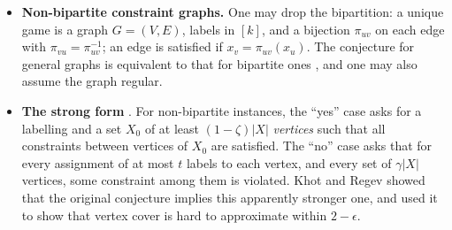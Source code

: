 \documentclass[handoutsbeamer.tex]{subfiles}
\begin{document}
\begin{frame}
\begin{itemize}\setlength\itemsep{0.35em}
    \item \textbf{Non-bipartite constraint graphs.} One may drop the bipartition: a unique game is a graph $G=(V,E)$, labels in $[k]$, and a bijection $\pi_{uv}$ on each edge with $\pi_{vu} = \pi_{uv}^{-1}$; an edge is satisfied if $x_v = \pi_{uv}(x_u)$. The conjecture for general graphs is equivalent to that for bipartite ones \citep{KhotSurvey}, and one may also assume the graph regular.
    \item \textbf{The strong form} \citep{khot2008vertex}. For non-bipartite instances, the ``yes'' case asks for a labelling and a set $X_0$ of at least $(1-\zeta)|X|$ \emph{vertices} such that all constraints between vertices of $X_0$ are satisfied. The ``no'' case asks that for every assignment of at most $t$ labels to each vertex, and every set of $\gamma|X|$ vertices, some constraint among them is violated. Khot and Regev showed that the original conjecture implies this apparently stronger one, and used it to show that vertex cover is hard to approximate within $2-\epsilon$.
\end{itemize}
\end{frame}
\end{document}
